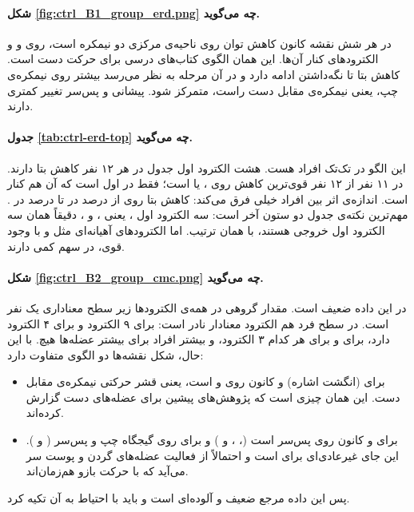 
\paragraph{شکل \ref{fig:ctrl_B1_group_erd.png} چه می‌گوید.} در هر شش نقشه کانون کاهش توان روی ناحیه‌ی مرکزی دو نیمکره است، روی  و  و الکترودهای  کنار آن‌ها. این همان الگوی کتاب‌های درسی برای حرکت دست است. کاهش بتا تا نگه‌داشتن ادامه دارد و در آن مرحله به نظر می‌رسد بیشتر روی نیمکره‌ی چپ، یعنی نیمکره‌ی مقابل دست راست، متمرکز شود. پیشانی و پس‌سر تغییر کمتری دارند.



\paragraph{جدول \ref{tab:ctrl-erd-top} چه می‌گوید.} این الگو در تک‌تک افراد هست. هشت الکترود اول جدول در هر ۱۲ نفر کاهش بتا دارند. در ۱۱ نفر از ۱۲ نفر قوی‌ترین کاهش روی ،  یا  است؛ فقط در  اول  است که آن هم کنار  است. اندازه‌ی اثر بین افراد خیلی فرق می‌کند: کاهش بتا روی  از  درصد در  تا  درصد در . مهم‌ترین نکته‌ی جدول دو ستون آخر است: سه الکترود اول ، یعنی ،  و ، دقیقاً همان سه الکترود اول  خروجی  هستند، با همان ترتیب. اما الکترودهای آهیانه‌ای مثل  و  با وجود  قوی، در  سهم کمی دارند.


\paragraph{شکل \ref{fig:ctrl_B2_group_cmc.png} چه می‌گوید.}  در این داده ضعیف است. مقدار گروهی در همه‌ی الکترودها زیر سطح معناداری یک نفر است. در سطح فرد هم الکترود معنادار نادر است:  برای  ۹ الکترود و برای  ۴ الکترود دارد،  برای  و  برای  هر کدام ۳ الکترود، و بیشتر افراد برای بیشتر عضله‌ها هیچ. با این حال، شکل نقشه‌ها دو الگوی متفاوت دارد:
\begin{itemize}
\item برای  (انگشت اشاره) و  کانون روی  و  است، یعنی قشر حرکتی نیمکره‌ی مقابل دست. این همان چیزی است که پژوهش‌های پیشین برای عضله‌های دست گزارش کرده‌اند.
\item برای  و  کانون روی پس‌سر است (، ،  و ) و برای  روی گیجگاه چپ و پس‌سر ( و ). این جای غیرعادی‌ای برای  است و احتمالاً از فعالیت عضله‌های گردن و پوست سر می‌آید که با حرکت بازو هم‌زمان‌اند.
\end{itemize}
پس  این داده مرجع ضعیف و آلوده‌ای است و باید با احتیاط به آن تکیه کرد.

